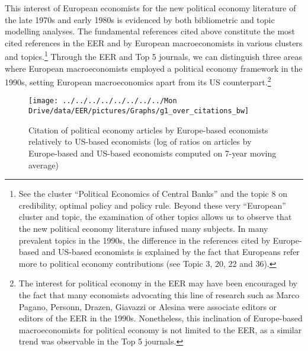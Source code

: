 \documentclass[
  12pt,
  onecolumn]{article}
\begin{document}
This interest of European economists for the new political economy literature of the late 1970s and early 1980s is evidenced by both bibliometric and topic modelling analyses. The fundamental references cited above constitute the most cited references in the EER and by European macroeconomists in various clusters and topics.\footnote{See the cluster ``Political Economics of Central Banks'' and the topic 8 on credibility, optimal policy and policy rule. Beyond these very ``European'' cluster and topic, the examination of other topics allows us to observe that the new political economy literature infused many subjects. In many prevalent topics in the 1990s, the difference in the references cited by Europe-based and US-based economists is explained by the fact that Europeans refer more to political economy contributions (see Topic 3, 20, 22 and 36).} Through the EER and Top 5 journals, we can distinguish three areas where European macroeconomists employed a political economy framework in the 1990s, setting European macroeconomics apart from its US counterpart.\footnote{The interest for political economy in the EER may have been encouraged by the fact that many economists advocating this line of research such as Marco Pagano, Personn, Drazen, Giavazzi or Alesina were associate editors or editors of the EER in the 1990s. Nonetheless, this inclination of Europe-based macroeconomists for political economy is not limited to the EER, as a similar trend was observable in the Top 5 journals.}

\begin{figure}[H]

{\centering \texttt{[image: ../../../../../../../../Mon Drive/data/EER/pictures/Graphs/g1\_over\_citations\_bw]} 

}

\caption{Citation of political economy articles by Europe-based economists relatively to US-based economists (log of ratios on articles by Europe-based and US-based economists computed on 7-year moving average)}\label{fig:plot-political-economy-europe}
\end{figure}
\end{document}
